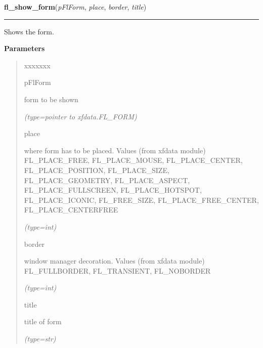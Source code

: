     \label{xformslib:flbasic:fl_show_form}

    \vspace{0.5ex}

\hspace{.8\funcindent}\begin{boxedminipage}{\funcwidth}

    \raggedright \textbf{fl\_show\_form}(\textit{pFlForm}, \textit{place}, \textit{border}, \textit{title})

    \vspace{-1.5ex}

    \rule{\textwidth}{0.5\fboxrule}
\setlength{\parskip}{2ex}
    Shows the form.

\setlength{\parskip}{1ex}
      \textbf{Parameters}
      \vspace{-1ex}

      \begin{quote}
        \begin{Ventry}{xxxxxxx}

          \item[pFlForm]

          form to be shown

            {\it (type=pointer to xfdata.FL\_FORM)}

          \item[place]

          where form has to be placed. Values (from xfdata module) 
          FL\_PLACE\_FREE, FL\_PLACE\_MOUSE, FL\_PLACE\_CENTER, 
          FL\_PLACE\_POSITION, FL\_PLACE\_SIZE, FL\_PLACE\_GEOMETRY, 
          FL\_PLACE\_ASPECT, FL\_PLACE\_FULLSCREEN, FL\_PLACE\_HOTSPOT, 
          FL\_PLACE\_ICONIC, FL\_FREE\_SIZE, FL\_PLACE\_FREE\_CENTER, 
          FL\_PLACE\_CENTERFREE

            {\it (type=int)}

          \item[border]

          window manager decoration. Values (from xfdata module) 
          FL\_FULLBORDER, FL\_TRANSIENT, FL\_NOBORDER

            {\it (type=int)}

          \item[title]

          title of form

            {\it (type=str)}


\end{Ventry}
\end{quote}
\end{boxedminipage}
